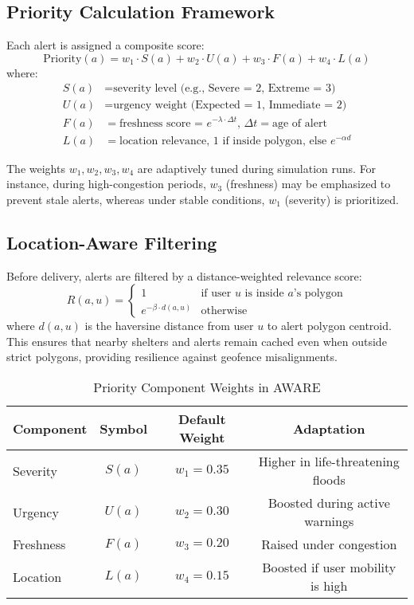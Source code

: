\documentclass[11pt,twocolumn]{article}
\begin{document}
\subsection{Priority Calculation Framework}

Each alert is assigned a composite score:
\begin{equation}
    \text{Priority}(a) = w_1 \cdot S(a) + w_2 \cdot U(a) + w_3 \cdot F(a) + w_4 \cdot L(a)
\end{equation}
where:
\begin{align}
    S(a) &= \text{severity level (e.g., Severe = 2, Extreme = 3)} \\
    U(a) &= \text{urgency weight (Expected = 1, Immediate = 2)} \\
    F(a) &= \text{freshness score = $e^{-\lambda \cdot \Delta t}$, } \Delta t = \text{age of alert} \\
    L(a) &= \text{location relevance, 1 if inside polygon, else $e^{-\alpha d}$}
\end{align}

The weights $w_1, w_2, w_3, w_4$ are adaptively tuned during simulation runs. For instance, during high-congestion periods, $w_3$ (freshness) may be emphasized to prevent stale alerts, whereas under stable conditions, $w_1$ (severity) is prioritized.

\subsection{Location-Aware Filtering}

Before delivery, alerts are filtered by a distance-weighted relevance score:
\begin{equation}
    R(a,u) = \begin{cases}
        1 & \text{if user $u$ is inside $a$'s polygon} \\
        e^{-\beta \cdot d(a,u)} & \text{otherwise}
    \end{cases}
\end{equation}
where $d(a,u)$ is the haversine distance from user $u$ to alert polygon centroid. This ensures that nearby shelters and alerts remain cached even when outside strict polygons, providing resilience against geofence misalignments.

\begin{table}[h]
\centering
\caption{Priority Component Weights in AWARE}
\begin{tabular}{@{}lccc@{}}
\toprule
\textbf{Component} & \textbf{Symbol} & \textbf{Default Weight} & \textbf{Adaptation} \\ \midrule
Severity & $S(a)$ & $w_1 = 0.35$ & Higher in life-threatening floods \\
Urgency & $U(a)$ & $w_2 = 0.30$ & Boosted during active warnings \\
Freshness & $F(a)$ & $w_3 = 0.20$ & Raised under congestion \\
Location & $L(a)$ & $w_4 = 0.15$ & Boosted if user mobility is high \\
\bottomrule
\end{tabular}
\end{table}
\end{document}
